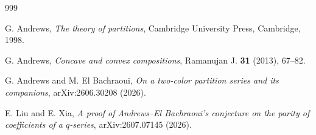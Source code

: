 \documentclass[12pt,reqno]{amsart}
\renewcommand{\(}{\left\(}
\renewcommand{\)}{\right\)}
\numberwithin{equation}{section}
\theoremstyle{plain}
\theoremstyle{definition}
\numberwithin{equation}{section}
\begin{document}
\begin{thebibliography}{999}
	
 G. Andrews, {\it The theory of partitions}, Cambridge University Press, Cambridge, 1998.

 G. Andrews, {\it Concave and convex compositions}, Ramanujan J. {\bf 31} (2013), 67--82.

 G. Andrews and M. El Bachraoui, {\it On a two-color partition series and its companions}, arXiv:2606.30208 (2026).

 E. Liu and E. Xia, {\it A proof of Andrews--El Bachraoui's conjecture on the parity of coefficients of a $q$-series}, arXiv:2607.07145 (2026).









  
\end{thebibliography}
\end{document}
